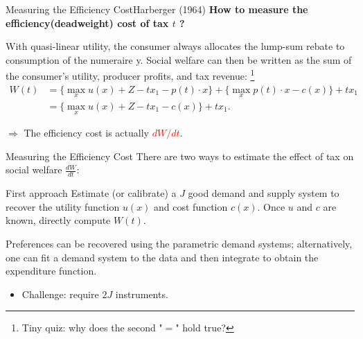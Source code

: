\documentclass{beamer}
\begin{document}
\begin{frame}{Measuring the Efficiency Cost}{Harberger (1964)}
	\textbf{How to measure the efficiency(deadweight) cost of tax $t$ ?}
	\medskip

	With quasi-linear utility, the consumer always allocates the lump-sum rebate to consumption of the numeraire y. Social welfare can then be written as the sum of the consumer’s utility, producer profits, and tax revenue: \footnote{Tiny quiz: why does the second "$=$" hold true?}
	\begin{equation}\label{welfare}
		\begin{aligned}
			W(t) &= \{\max_x u(x) + Z - tx_1 - p(t)\cdot x \} + \{\max_x p(t)\cdot x - c(x)\} + tx_1 \\
			&= \{\max_x u(x) + Z - tx_1 - c(x)\} + tx_1.
		\end{aligned}
	\end{equation}

	$\Rightarrow$ The efficiency cost is actually \textcolor{red}{$dW/dt$}.
\end{frame}
\begin{frame}{Measuring the Efficiency Cost}
	There are two ways to estimate the effect of tax on social welfare $\frac{dW}{dt}$:
	\begin{block}{First approach}
		Estimate (or calibrate) a $J$ good demand and supply system to recover the utility function $u(x)$ and cost function $c(x)$. Once $u$ and $c$ are known, directly compute $W(t)$.
		\medskip

		Preferences can be recovered using the parametric demand systems; alternatively, one can fit a demand system to the data and then integrate to obtain the expenditure function.
		\begin{itemize}
			\item Challenge: require $2J$ instruments.
		\end{itemize}
	\end{block}
\end{frame}
\end{document}
